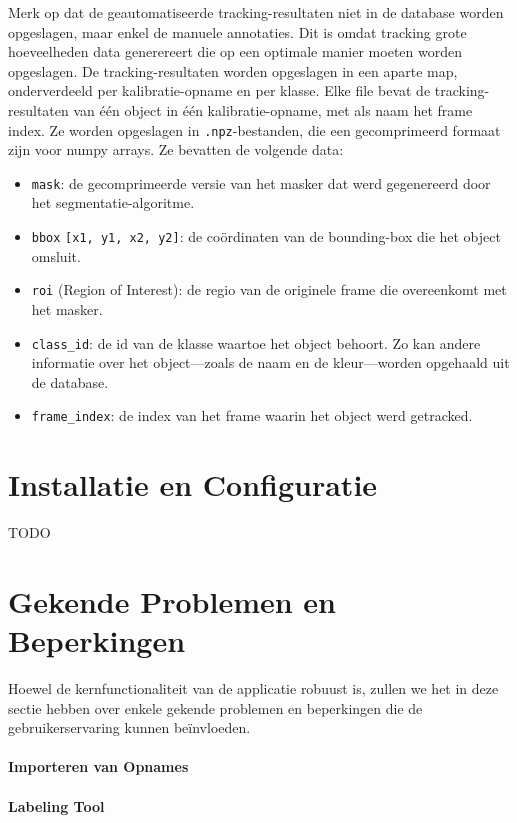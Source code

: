 Merk op dat de geautomatiseerde tracking-resultaten niet in de database worden opgeslagen, maar enkel de manuele annotaties.
Dit is omdat tracking grote hoeveelheden data generereert die op een optimale manier moeten worden opgeslagen.
De tracking-resultaten worden opgeslagen in een aparte map, onderverdeeld per kalibratie-opname en per klasse.
Elke file bevat de tracking-resultaten van één object in één kalibratie-opname, met als naam het frame index.
Ze worden opgeslagen in \texttt{.npz}-bestanden, die een gecomprimeerd formaat zijn voor numpy arrays.
Ze bevatten de volgende data:
\begin{itemize}
  \item \texttt{mask}: de gecomprimeerde versie van het masker dat werd gegenereerd door het segmentatie-algoritme.
  \item \texttt{bbox} \texttt{[x1, y1, x2, y2]}: de coördinaten van de bounding-box die het object omsluit.
  \item \texttt{roi} (Region of Interest): de regio van de originele frame die overeenkomt met het masker.
  \item \texttt{class\_id}: de id van de klasse waartoe het object behoort. 
  Zo kan andere informatie over het object---zoals de naam en de kleur---worden opgehaald uit de database.
  \item \texttt{frame\_index}: de index van het frame waarin het object werd getracked.
\end{itemize}

\section{Installatie en Configuratie}

TODO

\section{Gekende Problemen en Beperkingen}

Hoewel de kernfunctionaliteit van de applicatie robuust is, zullen we het in deze sectie hebben 
over enkele gekende problemen en beperkingen die de gebruikerservaring kunnen beïnvloeden.


\paragraph{Importeren van Opnames}

\paragraph{Labeling Tool}

\subsection{}
